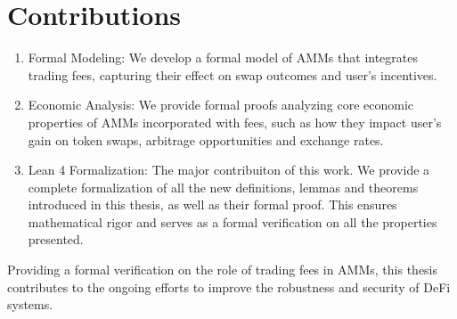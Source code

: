 \section{Contributions}
\begin{enumerate}
    \item Formal Modeling: We develop a formal model of AMMs that integrates trading fees, capturing their effect on swap outcomes and user's incentives. 
    \item Economic Analysis: We provide formal proofs analyzing core economic properties of AMMs incorporated with fees, such as how they impact user's gain on token swaps, arbitrage opportunities and exchange rates. 
    \item Lean 4 Formalization: The major contribuiton of this work. We provide a complete formalization of all the new definitions, lemmas and theorems introduced in this thesis, as well as their formal proof. This ensures mathematical rigor and serves as a formal verification on all the properties presented.  
\end{enumerate}

Providing a formal verification on the role of trading fees in AMMs, this thesis contributes to the ongoing efforts to improve the robustness and security of DeFi systems. 
